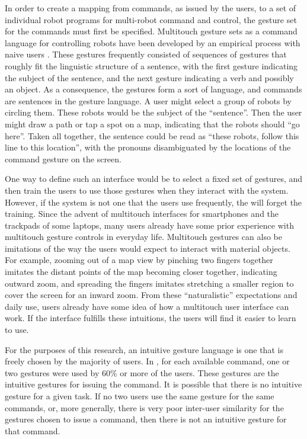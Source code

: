 \documentclass[]{article}
\begin{document}
In order to create a mapping from commands, as issued by the users, to a set of individual robot programs for multi-robot command and control, the gesture set for the commands must first be specified. 
Multitouch gesture sets as a command language for controlling robots have been developed by an empirical process with naive users \cite{Micire:2009:ANG:1731903.1731912}. 
These gestures frequently consisted of sequences of gestures that roughly fit the linguistic structure of a sentence, with the first gesture indicating the subject of the sentence, and the next gesture indicating a verb and possibly an object. 
As a consequence, the gestures form a sort of language, and commands are sentences in the gesture language.
A user might select a group of robots by circling them. 
These robots would be the subject of the ``sentence''.
Then the user might draw a path or tap a spot on a map, indicating that the robots should ``go here''. 
Taken all together, the sentence could be read as ``these robots, follow this line to this location'', with the pronouns disambiguated by the locations of the command gesture on the screen.

One way to define such an interface would be to select a fixed set of gestures, and then train the users to use those gestures when they interact with the system. 
However, if the system is not one that the users use frequently, the will forget the training. 
Since the advent of multitouch interfaces for smartphones and the trackpads of some laptops, many users already have some prior experience with multitouch gesture controls in everyday life. 
Multitouch gestures can also be imitations of the way the users would expect to interact with material objects. 
For example, zooming out of a map view by pinching two fingers together imitates the distant points of the map becoming closer together, indicating outward zoom, and spreading the fingers imitates stretching a smaller region to cover the screen for an inward zoom. 
From these ``naturalistic'' expectations and daily use, users already have some idea of how a multitouch user interface can work. 
If the interface fulfills these intuitions, the users will find it easier to learn to use. 

For the purposes of this research, an intuitive gesture language is one that is freely chosen by the majority of users. 
In \cite{Micire:2009:ANG:1731903.1731912}, for each available command, one or two gestures were used by 60\% or more of the users. 
These gestures are the intuitive gestures for issuing the command. 
It is possible that there is no intuitive gesture for a given task.
If no two users use the same gesture for the same commands, or, more generally, there is very poor inter-user similarity for the gestures chosen to issue a command, then there is not an intuitive gesture for that command.
\end{document}
